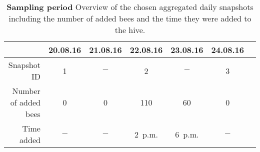 \begin{table}[htb]
\small
\centering
\caption[Sampling period]{\textbf{Sampling period} Overview of the chosen aggregated daily snapshots including the number of added bees and the time they were added to the hive.}
\vspace*{5mm}
\begin{tabularx}{\textwidth}{rcccccc}
\toprule
{} & 20.08.16 & 21.08.16 & 22.08.16 & 23.08.16 & 24.08.16 \\
\midrule
Snapshot ID & 1 & $-$ & 2 & $-$ & 3 & \\
Number of added bees & 0 & 0 & 110 & 60 & 0 \\
Time added & $-$ & $-$ & 2~p.m. & 6~p.m. & $-$ \\
\bottomrule
\end{tabularx}
\label{tab:networks}
\end{table}